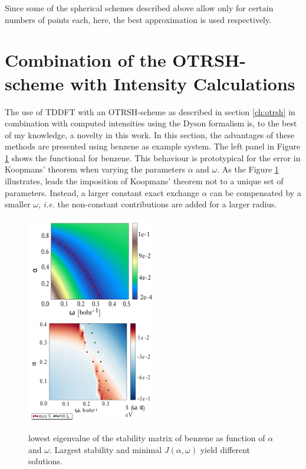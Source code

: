 Since some of the spherical schemes described above allow only for certain numbers of points each, here, the best approximation is used respectively.

\section{Combination of the OTRSH-scheme with Intensity Calculations}
The use of TDDFT with an OTRSH-scheme as described in section \ref{ch:otrsh} in combination with computed intensities using the Dyson formalism is, to the best of my knowledge, a novelty in this work.
In this section, the advantages of these methods are presented using benzene as example system.
The left panel in Figure \ref{fig:Benzotrsh} shows the functional  for benzene.
This behaviour is prototypical for the error in Koopmans' theorem when varying the parameters $\alpha$ and $\omega$.
As the Figure \ref{fig:Benzotrsh} illustrates, leads the imposition of Koopmans' theorem not to a unique set of parameters.
Instead, a larger constant exact exchange $\alpha$ can be compensated by a smaller $\omega$, \textit{i.e.} the non-constant contributions are added for a larger radius.
\begin{figure}
\includegraphics[width=0.5\textwidth]{Figures/Benzene/benzene2D}
\includegraphics[width=0.5\textwidth]{Figures/Benzene/benzene_S_stab_ion_cut_all.pdf}
\caption{lowest eigenvalue of the stability matrix of benzene as function of $\alpha$ and $\omega$. Largest stability and minimal $J(\alpha, \omega)$ yield different solutions.}
\label{fig:Benzotrsh}
\end{figure}
